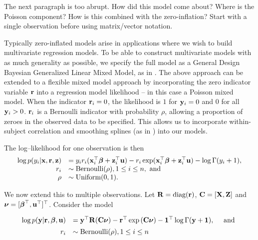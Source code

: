 \documentclass{amsart}[12pt]
\newcommand{\joc}[1]{{\color{red}#1}}
\begin{document}
\joc{The next paragraph is too abrupt. How did this model come about? Where is the Poisson component? How is this combined with the zero-inflation?
Start with a single observation before using matrix/vector notation.}

Typically zero-inflated models arise in applications where we wish to build multivariate regression models. To
be able to construct multivariate models with as much generality as possible, we specify the full model as a
General Design Bayesian Generalized Linear Mixed Model, as in \citep{zhao06}.
The above approach can be extended to a flexible mixed model approach by incorporating the zero indicator
variable ${\bf r}$ into a regression model likelihood -- in this case a Poisson mixed model. When the indicator
${\bf r}_i = 0$, the likelihood is $1$ for ${\bf y}_i = 0$ and $0$ for all ${\bf y}_i > 0$. ${\bf r}_i$ is a Bernoulli
indicator with probability $\rho$, allowing a proportion of zeroes in the observed data to be specified.
This allows us to incorporate within-subject correlation and smoothing splines (as in
\citep{Wand2008}) into our models.

The log--likelihood for one observation is then
\begin{equation*}
	\begin{array}{rl}
		\log p(y_i | {\bf x}, {\bf r}, {\bf z}) & = y_i r_i ({\bf x}_i^\top {\boldsymbol\beta} + {\bf z}_i^\top {\bf u}) - r_i \exp ({\bf x}_i^\top {\boldsymbol\beta} + {\bf z}_i^\top {\bf u}) - \log \Gamma (y_i + 1), \\
		r_i                         & \sim \text{Bernoulli}(\rho), 1 \leq i \leq n, \text{ and }                                                              \\
		\rho                        & \sim \mbox{Uniform}(0, 1).                                                                                              \\
	\end{array}
\end{equation*}

\noindent We now extend this to multiple observations. Let ${\bf R} = \text{diag}{({\bf r})}$, ${\bf C} = [{\bf X}, {\bf Z}]$ and ${\boldsymbol \nu} = [{\boldsymbol \beta}^\top, {\bf u}^\top]^\top$. Consider the model

\begin{equation}\label{eq:main}
	\begin{array}{rl}
		\log{p({\bf y}|{\bf r}, {\boldsymbol\beta}, {\bf u})} & = {\bf y}^\top {\bf R} ({\bf C}{\boldsymbol \nu}) - {\bf r}^\top \exp{({\bf C}{\boldsymbol\nu})} - {\bf 1}^\top \log{\Gamma{({\bf y}+ {\bf1})}}, \quad \mbox{ and } \\ [1ex]
		r_i                           & \sim \text{Bernoulli}(\rho), 1 \leq i \leq n                                                                     \\
	\end{array}
\end{equation}
\end{document}
